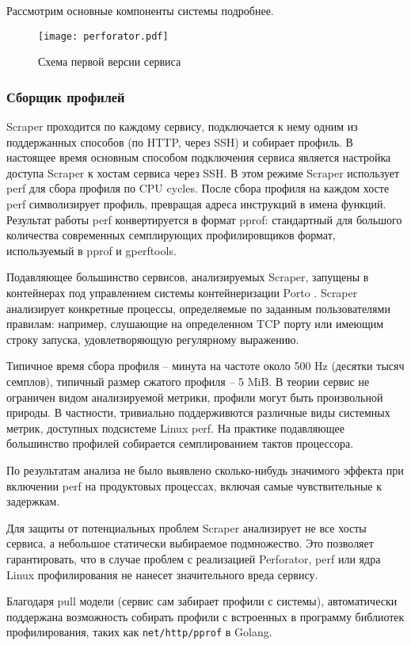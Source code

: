 Рассмотрим основные компоненты системы подробнее.

\begin{figure}[H]
    \centering
    \texttt{[image: perforator.pdf]}
    \caption{Схема первой версии сервиса}
    \label{fig:simple}
\end{figure}

\subsubsection{Сборщик профилей}
Scraper проходится по каждому сервису, подключается к нему одним из поддержанных способов (по HTTP, через SSH) и собирает профиль.
В настоящее время основным способом подключения сервиса является настройка доступа Scraper к хостам сервиса через SSH.
В этом режиме Scraper использует perf для сбора профиля по CPU cycles.
После сбора профиля на каждом хосте perf символизирует профиль, превращая адреса инструкций в имена функций.
Результат работы perf конвертируется в формат pprof: стандартный для большого количества современных семплирующих профилировщиков
формат, используемый в pprof и gperftools.

Подавляющее большинство сервисов, анализируемых Scraper, запущены в контейнерах под управлением системы контейнеризации Porto \cite{porto}.
Scraper анализирует конкретные процессы, определяемые по заданным пользователями правилам:
например, слушающие на определенном TCP порту или имеющим строку запуска, удовлетворяющую регулярному выражению.

Типичное время сбора профиля – минута на частоте около 500 Hz (десятки тысяч семплов), типичный размер сжатого профиля – 5 MiB.
В теории сервис не ограничен видом анализируемой метрики, профили могут быть произвольной природы.
В частности, тривиально поддерживются различные виды системных метрик, доступных подсистеме Linux perf.
На практике подавляющее большинство профилей собирается семплированием тактов процессора.

По результатам анализа не было выявлено сколько-нибудь значимого эффекта при включении perf на продуктовых процессах,
включая самые чувствительные к задержкам.

Для защиты от потенциальных проблем Scraper анализирует не все хосты сервиса, а небольшое статически выбираемое подмножество.
Это позволяет гарантировать, что в случае проблем с реализацией Perforator, perf или ядра Linux профилирования не нанесет значительного
вреда сервису.

Благодаря pull модели (сервис сам забирает профили с системы), автоматически поддержана возможность собирать профили с встроенных
в программу библиотек профилирования, таких как \lstinline!net/http/pprof! \cite{golang:pprof} в Golang.

